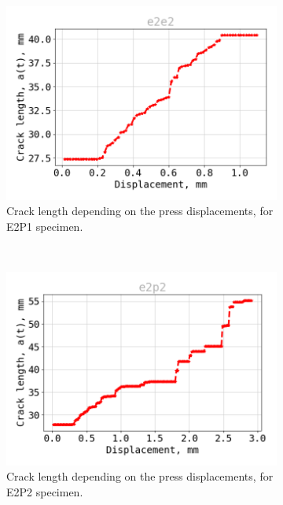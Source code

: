 \begin{figure}[H]
\centering
\begin{subfigure}{0.48\linewidth}
	\centering
	\includegraphics[scale=0.3]{Figures/e2p1_a}
	\decoRule
	\caption[Crack length E2P1]{Crack length depending on the press displacements, for E2P1 specimen.}
	\label{fig:E2P1_a}
\end{subfigure}
\hfill\\
\begin{subfigure}{0.48\linewidth}
	\centering
	\includegraphics[scale=0.3]{Figures/e2p2_a}
	\decoRule
	\caption[Crack length E2P2]{Crack length depending on the press displacements, for E2P2 specimen.}
	\label{fig:E2P2_a}
\end{subfigure}
\hfill\\
\begin{subfigure}{0.48\linewidth}

\end{subfigure}
\end{figure}
